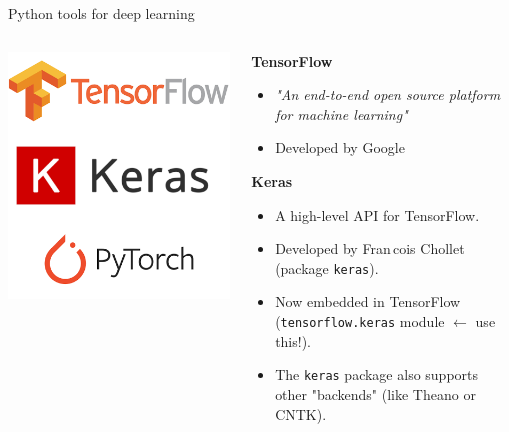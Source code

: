 \documentclass[9pt, aspectratio=169]{beamer}
\begin{document}
\begin{frame}
    {Python tools for deep learning}

    \begin{columns}
        \begin{column}{.3\textwidth}
            \centering
            \includegraphics[width=\textwidth]{tf_keras_pythorch_logo.png}
        \end{column}

        \begin{column}{.7\textwidth}
            \textbf{TensorFlow}
            \begin{itemize}
                \item \textit{"An end-to-end open source platform for machine learning"}
                \item Developed by Google
            \end{itemize}

            \textbf{Keras}
            \begin{itemize}
                \item A high-level API for TensorFlow.
                \item Developed by Fran\,cois Chollet (package \texttt{keras}).
                \item Now embedded in TensorFlow (\texttt{tensorflow.keras} module $\leftarrow$ use this!).
                \item The \texttt{keras} package also supports other "backends" (like Theano or CNTK).
            \end{itemize}


\end{column}
\end{columns}
\end{frame}
\end{document}
